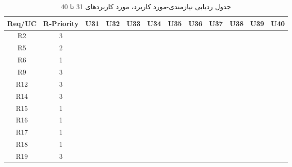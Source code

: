 \documentclass[12pt]{article}
\begin{document}
	\newpage
	\begin{longtable}{|c|c|c|c|c|c|c|c|c|c|c|c|}
		\caption{جدول ردیابی نیازمندی-مورد کاربرد، مورد کاربردهای 31 تا 40}
		\label{tab:req-uc-31-40}
		\endfirsthead
		\endhead
		\hline
		Req/UC      & R-Priority & U31      & U32      & U33      & U34      & U35      & U36      & U37      & U38      & U39      & U40      \\
		\hline
		R2          & 3          &           &           &           &           &           &           &           &           &           &           \\
		\hline
		R5          & 2          &           &           &           &           &           &           &           &           &           &           \\
		\hline
		R6          & 1          &           &           &           &           &           &           &           &           &           &           \\
		\hline
		R9          & 3          &           &           &           &           &           &           &           &           &           &           \\
		\hline
		R12         & 3          &           &           &           &           &           &           &           &           & \ding{51} &           \\
		\hline
		R14         & 3          &           &           &           &           &           &           &           &           &           &           \\
		\hline
		R15         & 1          &           &           &           &           &           &           &           &           &           &           \\
		\hline
		R16         & 1          &           &           &           &           &           &           &           &           &           &           \\
		\hline
		R17         & 1          &           &           &           &           &           &           &           &           &           &           \\
		\hline
		R18         & 1          &           &           &           &           &           &           &           &           &           &           \\
		\hline
		R19         & 3          &           &           &           &           &           &           &           &           &           &           \\
		\hline

\end{longtable}
\end{document}
